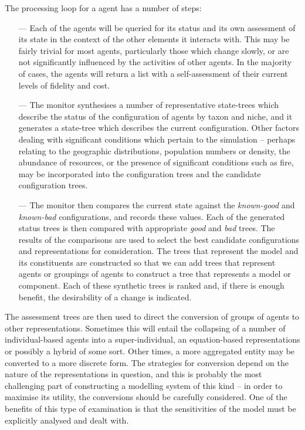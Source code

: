 The processing loop for a  agent has a number of
steps:
\begin{itemize}
\item[---] Each of the agents will be queried for its status
and its own assessment of its state in the context of the other
elements it interacts with.  This may be fairly trivial for most
agents, particularly those which change slowly, or are not
significantly influenced by the activities of other agents.
In the majority of cases, the agents will return a list with a
self-assessment of their current levels of fidelity and cost.
\item[---] The monitor synthesises a number of representative
state-trees which describe the status of the configuration of agents
by taxon and niche, and it generates a state-tree which describes the
current configuration. Other factors dealing with significant
conditions which pertain to the simulation -- perhaps relating to the
geographic distributions, population numbers or density, the abundance
of resources, or the presence of significant conditions such as fire,
may be incorporated into the configuration trees and the candidate
configuration trees.
\item[---] The monitor then compares the current state against
the \emph{known-good} and \emph{known-bad} configurations, and records
these values.  Each of the generated status trees is then compared
with appropriate \emph{good} and \emph{bad} trees. The results of the
comparisons are used to select the best candidate configurations and
representations for consideration.  The trees that represent the model
and its constituents are constructed so that we can add trees that
represent agents or groupings of agents to construct a tree that
represents a model or component. Each of these synthetic trees is
ranked and, if there is enough benefit, the desirability of a change
is indicated.
\end{itemize}

The assessment trees are then used to direct the conversion of groups
of agents to other representations.  Sometimes this will entail the
collapsing of a number of individual-based agents into a
super-individual, an equation-based representations or possibly a
hybrid of some sort.  Other times, a more aggregated entity may be
converted to a more discrete form. The strategies for conversion
depend on the nature of the representations in question, and this is
probably the most challenging part of constructing a modelling system
of this kind -- in order to maximise its utility, the conversions
should be carefully considered.  One of the benefits of this type of
examination is that the sensitivities of the model must be explicitly
analysed and dealt with.

